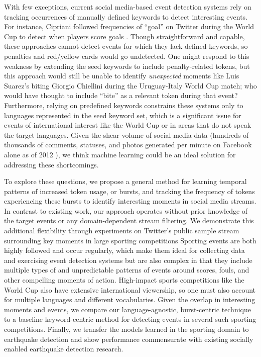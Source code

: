 \documentclass{sig-alternate}
\begin{document}
With few exceptions, current social media-based event detection systems rely on tracking occurrences of manually defined keywords to detect interesting events.
For instance, Cipriani followed frequencies of ``goal'' on Twitter during the World Cup to detect when players score goals \cite{Cipriani2014}.
Though straightforward and capable, these approaches cannot detect events for which they lack defined keywords, so penalties and red/yellow cards would go undetected.
One might respond to this weakness by extending the seed keywords to include penalty-related tokens, but this approach would still be unable to identify \emph{unexpected} moments like Luis Suarez's biting Giorgio Chiellini during the Uruguay-Italy World Cup match; who would have thought to include ``bite'' as a relevant token during that event?
Furthermore, relying on predefined keywords constrains these systems only to languages represented in the seed keyword set, which is a significant issue for events of international interest like the World Cup or in areas that do not speak the target languages.
Given the shear volume of social media data (hundreds of thousands of comments, statuses, and photos generated per minute on Facebook alone as of 2012 \cite{Pring2012}), we think machine learning could be an ideal solution for addressing these shortcomings.

To explore these questions, we propose a general method for learning temporal patterns of increased token usage, or bursts, and tracking the frequency of tokens experiencing these bursts to identify interesting moments in social media streams. 
In contrast to existing work, our approach operates without prior knowledge of the target events or any domain-dependent stream filtering.
We demonstrate this additional flexibility through experiments on Twitter's public sample stream surrounding key moments in large sporting competitions
Sporting events are both highly followed and occur regularly, which make them ideal for collecting data and exercising event detection systems but are also complex in that they include multiple types of and unpredictable patterns of events around scores, fouls, and other compelling moments of action.
High-impact sports competitions like the World Cup also have extensive international viewership, so one must also account for multiple languages and different vocabularies.
Given the overlap in interesting moments and events, we compare our language-agnostic, burst-centric technique to a baseline keyword-centric method for detecting events in several such sporting competitions.
Finally, we transfer the models learned in the sporting domain to earthquake detection and show performance commensurate with existing socially enabled earthquake detection research.
\end{document}
